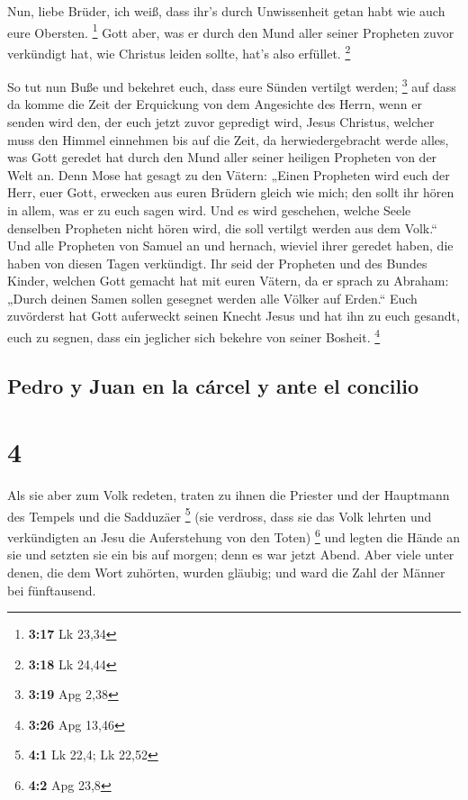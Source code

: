  Nun, liebe Brüder, ich weiß, dass ihr's durch
Unwissenheit getan habt wie auch eure Obersten. \footnote{\textbf{3:17}
  Lk 23,34}  Gott aber, was er durch den Mund aller
seiner Propheten zuvor verkündigt hat, wie Christus leiden sollte, hat's
also erfüllet. \footnote{\textbf{3:18} Lk 24,44}

 So tut nun Buße und bekehret euch, dass eure Sünden
vertilgt werden; \footnote{\textbf{3:19} Apg 2,38}  auf
dass da komme die Zeit der Erquickung von dem Angesichte des Herrn, wenn
er senden wird den, der euch jetzt zuvor gepredigt wird, Jesus Christus,
 welcher muss den Himmel einnehmen bis auf die Zeit, da
herwiedergebracht werde alles, was Gott geredet hat durch den Mund aller
seiner heiligen Propheten von der Welt an.  Denn Mose hat
gesagt zu den Vätern: „Einen Propheten wird euch der Herr, euer Gott,
erwecken aus euren Brüdern gleich wie mich; den sollt ihr hören in
allem, was er zu euch sagen wird.  Und es wird geschehen,
welche Seele denselben Propheten nicht hören wird, die soll vertilgt
werden aus dem Volk.``  Und alle Propheten von Samuel an
und hernach, wieviel ihrer geredet haben, die haben von diesen Tagen
verkündigt.  Ihr seid der Propheten und des Bundes
Kinder, welchen Gott gemacht hat mit euren Vätern, da er sprach zu
Abraham: „Durch deinen Samen sollen gesegnet werden alle Völker auf
Erden.``  Euch zuvörderst hat Gott auferweckt seinen
Knecht Jesus und hat ihn zu euch gesandt, euch zu segnen, dass ein
jeglicher sich bekehre von seiner Bosheit. \footnote{\textbf{3:26} Apg
  13,46}

\hypertarget{pedro-y-juan-en-la-cuxe1rcel-y-ante-el-concilio}{%
\subsection{Pedro y Juan en la cárcel y ante el
concilio}\label{pedro-y-juan-en-la-cuxe1rcel-y-ante-el-concilio}}

\hypertarget{section-3}{%
\section{4}\label{section-3}}

 Als sie aber zum Volk redeten, traten zu ihnen die
Priester und der Hauptmann des Tempels und die Sadduzäer \footnote{\textbf{4:1}
  Lk 22,4; Lk 22,52}  (sie verdross, dass sie das Volk
lehrten und verkündigten an Jesu die Auferstehung von den Toten)
\footnote{\textbf{4:2} Apg 23,8}  und legten die Hände an
sie und setzten sie ein bis auf morgen; denn es war jetzt Abend.
 Aber viele unter denen, die dem Wort zuhörten, wurden
gläubig; und ward die Zahl der Männer bei fünftausend.

